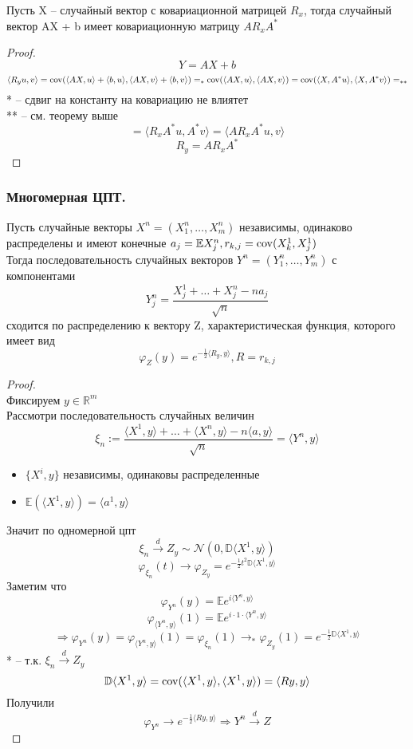     \begin{theorem}
        Пусть X -- случайный вектор с ковариационной матрицей $R_x$, тогда случайный вектор AX + b имеет ковариационную матрицу $ AR_xA^* $
    \end{theorem}
    \begin{proof}
        $$ Y = AX + b $$
        $$ \langle R_yu, v\rangle = \operatorname{cov}(\langle AX, u \rangle + \langle b, u \rangle, \langle AX, v \rangle + \langle b, v \rangle) =_{*} \operatorname{cov}(\langle AX, u \rangle, \langle AX, v \rangle) = \operatorname{cov}(\langle X, A^*u \rangle, \langle X, A^{*}v \rangle) =_{**}$$
        * -- сдвиг на константу на ковариацию не влиятет\\
        ** -- см. теорему выше
        $$ = \langle R_xA^*u,A^*v\rangle =  \langle AR_xA^*u,v\rangle$$
        $$R_y = AR_xA^*$$
    \end{proof}
    \subsubsection{Многомерная ЦПТ.}
    \begin{theorem}
        Пусть случайные векторы $ X^n = (X^n_1,\ldots, X^n_m) $ независимы, одинаково распределены и имеют конечные $ a_j = \mathbb{E}X^n_j, r_{k,j} = \operatorname{cov}(X^1_k, X^1_j) $\\
        Тогда последовательность случайных векторов $Y^n = (Y^n_1,\ldots, Y^n_m) $ с компонентами
        $$Y_j^n = \frac{X^1_j + \ldots + X^n_j - na_j}{\sqrt{n}}$$
        сходится по распределению к вектору Z, характеристическая функция, которого имеет вид
        $$\varphi_{Z}(y) = e^{-\frac{1}{2}\langle R_y,y\rangle}, R = r_{k,j}$$
    \end{theorem}
    \begin{proof}
        \text{ }\\
        Фиксируем $ y\in\mathbb{R}^m $\\
        Рассмотри последовательность случайных величин
        $$\xi_n:=\frac{\langle X^1, y\rangle + \ldots + \langle X^n, y\rangle - n\langle a, y\rangle}{\sqrt{n}} = \langle Y^n, y \rangle$$
        \begin{itemize}
            \item $\{X^i, y\}$ независимы, одинаковы распределенные
            \item $\mathbb{E}(\langle X^1, y\rangle) = \langle a^1, y\rangle$
        \end{itemize}
    Значит по одномерной цпт
    $$\xi_n\xrightarrow{d}Z_y\sim \mathcal{N}(0,\mathbb{D}\langle X^1, y\rangle)$$
    $$\varphi_{\xi_n}(t)\to\varphi_{Z_y} = e^{-\frac{1}{2}t^2\mathbb{D}\langle X^1, y\rangle}$$
    Заметим что
    $$\varphi_{Y^n}(y) = \mathbb{E}e^{i\langle Y^n, y\rangle}$$
    $$\varphi_{\langle Y^n, y\rangle}(1) = \mathbb{E}e^{i\cdot1\cdot\langle Y^n, y\rangle}$$
    $$\Rightarrow \varphi_{Y^n}(y) = \varphi_{\langle Y^n, y\rangle}(1) = \varphi_{\xi_n}(1) \to_{*} \varphi_{Z_y}(1) = e^{-\frac{1}{2}\mathbb{D}\langle X^1, y\rangle}$$
    * -- т.к. $ \xi_n\xrightarrow{d} Z_y $
    $$\mathbb{D}\langle X^1, y\rangle = \operatorname{cov}(\langle X^1, y\rangle , \langle X^1, y\rangle ) = \langle R y, y\rangle $$
    Получили
    $$\varphi_{Y^n}\to e^{-\frac{1}{2}\langle R y, y\rangle } \Rightarrow Y^n\xrightarrow{d}Z$$
    \end{proof}
